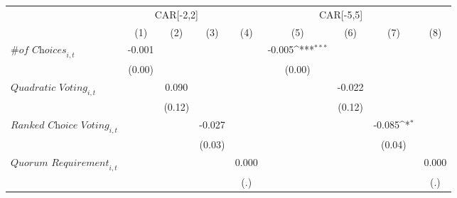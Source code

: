 {
\def\sym#1{\ifmmode^{#1}\else\(^{#1}\)\fi}
\begin{tabular}{l*{8}{c}}
\toprule
                    &\multicolumn{3}{c}{CAR[-2,2]}                                    &\multicolumn{5}{c}{CAR[-5,5]}                                                                                \\\cmidrule(lr){2-4}\cmidrule(lr){5-9}
                    &\multicolumn{1}{c}{(1)}         &\multicolumn{1}{c}{(2)}         &\multicolumn{1}{c}{(3)}         &\multicolumn{1}{c}{(4)}         &\multicolumn{1}{c}{(5)}         &\multicolumn{1}{c}{(6)}         &\multicolumn{1}{c}{(7)}         &\multicolumn{1}{c}{(8)}         \\
\midrule
$\textit{\# of Choices}_{i,t}$&      -0.001         &                     &                     &                     &      -0.005\sym{***}&                     &                     &                     \\
                    &      (0.00)         &                     &                     &                     &      (0.00)         &                     &                     &                     \\
$\textit{Quadratic Voting}_{i,t}$&                     &       0.090         &                     &                     &                     &      -0.022         &                     &                     \\
                    &                     &      (0.12)         &                     &                     &                     &      (0.12)         &                     &                     \\
$\textit{Ranked Choice Voting}_{i,t}$&                     &                     &      -0.027         &                     &                     &                     &      -0.085\sym{*}  &                     \\
                    &                     &                     &      (0.03)         &                     &                     &                     &      (0.04)         &                     \\
$\textit{Quorum Requirement}_{i,t}$&                     &                     &                     &       0.000         &                     &                     &                     &       0.000         \\
                    &                     &                     &                     &         (.)         &                     &                     &                     &         (.)         \\

\end{tabular}}
